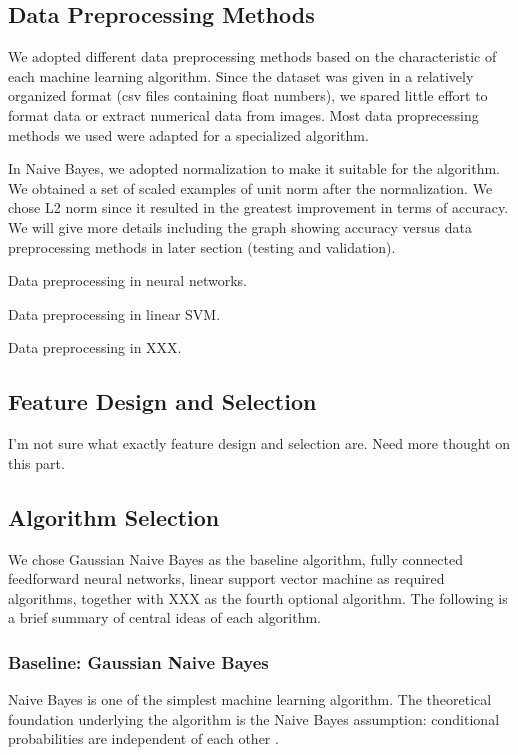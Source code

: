 \documentclass{acm_proc_article-sp}
\begin{document}
\subsection{Data Preprocessing Methods}
We adopted different data preprocessing methods based on the characteristic of each machine learning algorithm. Since the dataset was given in a relatively organized format (csv files containing float numbers), we spared little effort to format data or extract numerical data from images. Most data proprecessing methods we used were adapted for a specialized algorithm.

In Naive Bayes, we adopted normalization to  make it suitable for the algorithm. We obtained a set of scaled examples of unit norm after the normalization. We chose L2 norm since it resulted in the greatest improvement in terms of accuracy. We will give more details including the graph showing accuracy versus data preprocessing methods in later section (testing and validation).

Data preprocessing in neural networks. 

Data preprocessing in linear SVM.

Data preprocessing in XXX.

\subsection{Feature Design and Selection}
I'm not sure what exactly feature design and selection are. Need more thought on this part.

\subsection{Algorithm Selection}
We chose Gaussian Naive Bayes as the baseline algorithm, fully connected feedforward neural networks, linear support vector machine as required algorithms, together with XXX as the fourth optional algorithm. The following is a brief summary of central ideas of each algorithm.

\subsubsection{Baseline: Gaussian Naive Bayes}
Naive Bayes is one of the simplest machine learning algorithm. The theoretical foundation underlying the algorithm is the Naive Bayes assumption: conditional probabilities are independent of each other \cite{pineaul5}.
\end{document}
